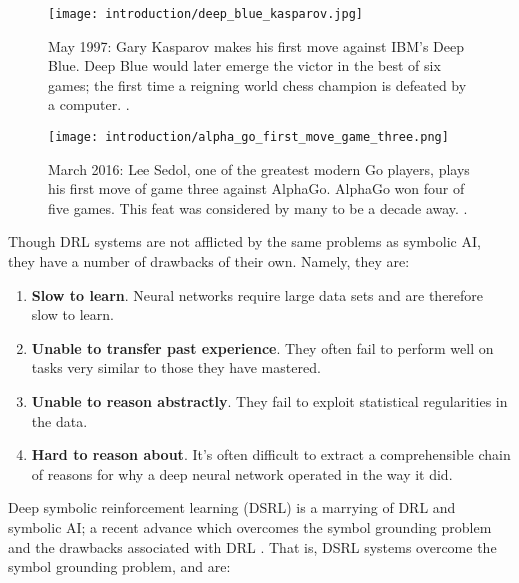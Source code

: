 \begin{figure}[h!]
\centering
\begin{minipage}{.45\textwidth}
  \centering
\texttt{[image: introduction/deep\_blue\_kasparov.jpg]}
  \caption{May 1997: Gary Kasparov makes his first move against IBM's Deep Blue. Deep Blue would later emerge the victor in the best of six games; the first time a reigning world chess champion is defeated by a computer. \cite{Rosen2012}.}
  \label{fig:deep_blue_kasparov}
\end{minipage}%
  \hfill
\begin{minipage}{.45\textwidth}
  \centering
\texttt{[image: introduction/alpha\_go\_first\_move\_game\_three.png]}
  \caption{March 2016: Lee Sedol, one of the greatest modern Go players, plays his first move of game three against AlphaGo. AlphaGo won four of five games. This feat was considered by many to be a decade away. \cite{Ormerod2016}.}
  \label{fig:alpha_go_first_move_game_three}
\end{minipage}
\end{figure}

Though DRL systems are not afflicted by the same problems as symbolic AI, they have a number of drawbacks of their own. Namely, they are: \cite{Garnelo2016}

\begin{enumerate}
\item \textbf{Slow to learn}. Neural networks require large data sets and are therefore
slow to learn.
\item \textbf{Unable to transfer past experience}. They often fail to perform well on tasks very
similar to those they have mastered.
\item \textbf{Unable to reason abstractly}. They fail to exploit statistical regularities in the data.
\item \textbf{Hard to reason about}. It's often difficult to extract a comprehensible chain of reasons for why a deep neural network operated in the way it did.
\end{enumerate}

Deep symbolic reinforcement learning (DSRL) is a marrying of DRL and symbolic AI; a recent advance which overcomes the symbol grounding problem and the drawbacks associated with DRL \cite{Garnelo2016}. That is, DSRL systems overcome the symbol grounding problem, and are:

